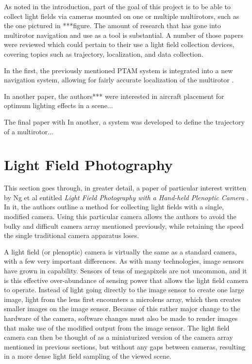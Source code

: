 \documentclass[12pt]{report}
\begin{document}
As noted in the introduction, part of the goal of this project is to be able to collect light fields via cameras mounted on one or multiple multirotors, such as the one pictured in ***figure. The amount of research that has gone into multirotor navigation and use as a tool is substantial. A number of those papers were reviewed which could pertain to their use a light field collection devices, covering topics such as trajectory, localization, and data collection. 

In the first, the previously mentioned PTAM system is integrated into a new navigation system, allowing for fairly accurate localization of the multirotor \cite{Engel12}.

In another paper, the authors*** were interested in aircraft placement for optimum lighting effects in a scene... \cite{Srikanth14}

The final paper with In another, a system was developed to define the trajectory of a multirotor... \cite{Roberts16}

\section{Light Field Photography}
This section goes through, in greater detail, a paper of particular interest written by Ng et al entitled \emph{Light Field Photography with a Hand-held Plenoptic Camera} \cite{Ng05}. In it, the authors outline a method for collecting light fields with a single, modified camera. Using this particular camera allows the authors to avoid the bulky and difficult camera array mentioned previously, while retaining the speed the single traditional camera apparatus loses.

A light field (or plenoptic) camera is virtually the same as a standard camera, with a few very important differences. As with many technologies, image sensors have grown in capability. Sensors of tens of megapixels are not uncommon, and it is this effective over-abundance of sensing power that allows the light field camera to operate. Instead of light going directly to the image sensor to create one large image, light from the lens first encounters a microlens array, which then creates smaller images on the image sensor. Because of this rather major change to the hardware of the camera, software changes must also be made to render images that make use of the modified output from the image sensor. The light field camera can then be thought of as a miniaturized version of the camera array mentioned in previous sections, but without any gaps between cameras, resulting in a more dense light field sampling of the viewed scene.
\end{document}
